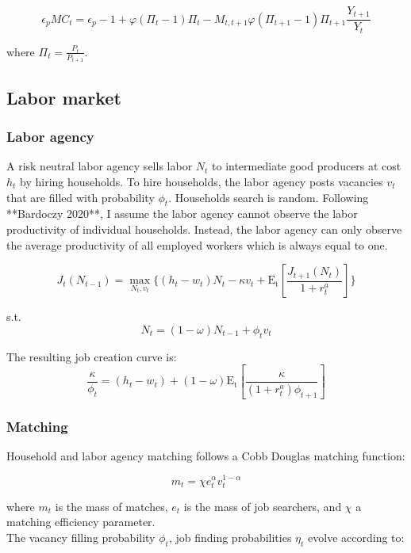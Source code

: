\documentclass[\econtexRoot/HAFiscal]{subfiles}
\begin{document}
$$ \epsilon_{p} MC_{t} = \epsilon_{p} - 1 + \varphi ( \Pi_{t} -1) \Pi_{t} - M_{t,t+1} \varphi (\Pi_{t+1} -1 ) \Pi_{t+1} \frac{Y_{t+1}}{Y_{t}}$$

where $ \Pi_{t} = \frac{P_{t}}{P_{t+1}}$. \\



\subsection{Labor market}

\subsubsection{Labor agency}

A risk neutral labor agency sells labor $N_{t}$ to intermediate good producers at cost $h_{t}$ by hiring households. To hire households, the labor agency posts vacancies $v_{t}$ that are filled with probability $\phi_{t}$.  Households search is random. Following **Bardoczy 2020**, I assume the labor agency cannot observe the labor productivity of individual households. Instead, the labor agency can only observe the average productivity of all employed workers which is always equal to one. 

$$J_{t}(N_{t-1})  = \max_{N_{t},v_{t}} \{( h_{t} - w_{t}) N_{t}- \kappa v_{t} + \mathrm{E_{t}}\left[ \frac{J_{t+1}(N_{t})}{1 + r^{a}_{t}}\right]\}$$

s.t.
$$ N_{t} = (1-\omega)N_{t-1} + \phi_{t} v_{t}$$ 

The resulting job creation curve is:
$$ \frac{\kappa}{\phi_{t}}  = (h_{t} - w_{t})+  (1-\omega)\mathrm{E_{t}}\left[   \frac{\kappa}{(1+r^{a}_{t}) \phi_{t+1}} \right]   $$


\subsubsection{Matching}

Household and labor agency matching follows a Cobb Douglas matching function:

$$m_{t} = \chi e_{t}^{\alpha} v_{t}^{1-\alpha}$$ 

where $m_{t}$ is the mass of matches, $ e_{t} $ is the mass of job searchers, and $\chi$ a matching efficiency parameter.\\

The vacancy filling probability $\phi_{t}$, job finding probabilities $\eta_{t}$ evolve according to:
\end{document}
